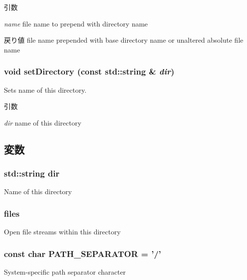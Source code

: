 \begin{DoxyParams}{引数}
\item[{\em name}]file name to prepend with directory name \end{DoxyParams}
\begin{DoxyReturn}{戻り値}
file name prepended with base directory name or unaltered absolute file name 
\end{DoxyReturn}
\hypertarget{classOutputDirectory_a3133e5972e0fa144664a06a665c01e74}{
\subsubsection[{setDirectory}]{\setlength{\rightskip}{0pt plus 5cm}void setDirectory (const std::string \& {\em dir})}}
\label{classOutputDirectory_a3133e5972e0fa144664a06a665c01e74}
Sets name of this directory. 
\begin{DoxyParams}{引数}
\item[{\em dir}]name of this directory \end{DoxyParams}


\subsection{変数}
\hypertarget{classOutputDirectory_ae1eb8abe7f66572b89cc139ca0c841ac}{
\subsubsection[{dir}]{\setlength{\rightskip}{0pt plus 5cm}std::string {\bf dir}}}
\label{classOutputDirectory_ae1eb8abe7f66572b89cc139ca0c841ac}
Name of this directory \hypertarget{classOutputDirectory_a79dfc0070f515bcd2cb6cdd5282ad4d8}{
\subsubsection[{files}]{ {\bf files}}}
\label{classOutputDirectory_a79dfc0070f515bcd2cb6cdd5282ad4d8}
Open file streams within this directory \hypertarget{classOutputDirectory_aa3d67123ee9a3ee4b138f06e57c2a54d}{
\subsubsection[{PATH\_\-SEPARATOR}]{\setlength{\rightskip}{0pt plus 5cm}const char {\bf PATH\_\-SEPARATOR} = '/'}}
\label{classOutputDirectory_aa3d67123ee9a3ee4b138f06e57c2a54d}
System-\/specific path separator character 

